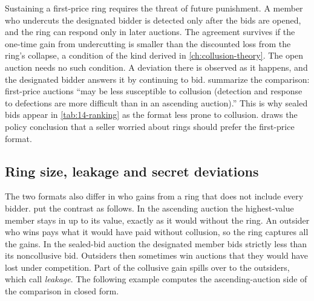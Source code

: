 Sustaining a first-price ring requires the threat of future punishment. A member who undercuts the
designated bidder is detected only after the bids are opened, and the ring can respond only in later
auctions. The agreement survives if the one-time gain from undercutting is smaller than the discounted
loss from the ring's collapse, a condition of the kind derived in \cref{ch:collusion-theory}. The
open auction needs no such condition. A deviation there is observed as it happens, and the designated
bidder answers it by continuing to bid. \citet[Section 7]{AtheyHaile2007} summarize the comparison:
first-price auctions ``may be less susceptible to collusion (detection and response to defections
are more difficult than in an ascending auction).'' This is why sealed bids appear in \cref{tab:14-ranking}
as the format less prone to collusion. \citet{Robinson1985} draws the policy conclusion that a seller
worried about rings should prefer the first-price format.

\subsection{Ring size, leakage and secret deviations}\label{sec:14-collusion-size}

The two formats also differ in who gains from a ring that does not include every bidder.
\citet[ch.~8, p.~176]{MarshallMarx2012} put the contrast as follows. In the ascending auction the
highest-value member stays in up to its value, exactly as it would without the ring. An outsider who
wins pays what it would have paid without collusion, so the ring captures all the gains. In the
sealed-bid auction the designated member bids strictly less than its noncollusive bid. Outsiders then
sometimes win auctions that they would have lost under competition. Part of the collusive gain spills
over to the outsiders, which \citet[p.~181]{MarshallMarx2012} call \emph{leakage}. The following example
computes the ascending-auction side of the comparison in closed form.

